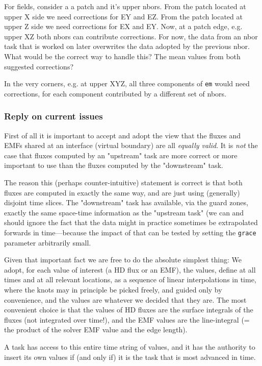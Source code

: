 \documentclass[paper=a4,fontsize=11pt]{scrartcl}
\numberwithin{equation}{section}		%
\numberwithin{figure}{section}			%
\numberwithin{table}{section}				%
\newcommand{\codecolor}{\color{Blue}}
\newcommand{\Code}[1]{{\codecolor\texttt{#1}}}
\begin{document}
For fields, consider a a patch and it's upper nbors. From the patch located at upper X side we need corrections for EY and EZ. From the patch located at upper Z side we need corrections for EX and EY. Now, at a patch edge, e.g. upper XZ both nbors can contribute corrections. For now, the data from an nbor task that is worked on later overwrites the data adopted by the previous nbor. What would be the correct way to handle this? The mean values from both suggested corrections? 

In the very corners, e.g. at upper XYZ, all three components of \Code{em} would need corrections, for each component contributed by a different set of nbors.

\subsubsection{Reply on current issues}
First of all it is important to accept and adopt the view that the fluxes and EMFs shared at an interface (virtual boundary) are all \textit{equally valid}. It is \textit{not} the case that fluxes computed by an "upstream" task are more correct or more important to use than the fluxes computed by the "downstream" task.  

The reason this (perhaps counter-intuitive) statement is correct is that both fluxes are computed in exactly the same way, and are just using (generally) disjoint time slices.  The "downstream" task has available, via the guard zones, exactly the same space-time information as the "upstream task" (we can and should ignore the fact that the data might in practice sometimes be extrapolated forwards in time---because the impact of that can be tested by setting the \Code{grace} parameter arbitrarily small.

Given that important fact we are free to do the absolute simplest thing:  We adopt, for each value of interest (a HD flux or an EMF), the values, define at all times and at all relevant locations, as a sequence of linear interpolations in time, where the knots may in principle be picked freely, and guided only by convenience, and the values are whatever we decided that they are.  The most convenient choice is that the values of HD fluxes are the surface integrals of the fluxes (not integrated over time!), and the EMF values are the line-integral (= the product of the solver EMF value and the edge length).

A task has access to this entire time string of values, and it has the authority to insert its own values if (and only if) it is the task that is most advanced in time.
\end{document}
